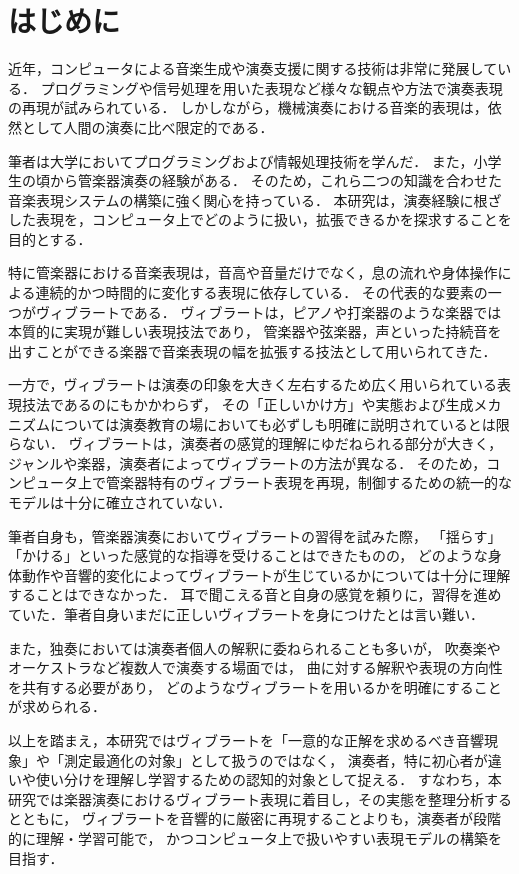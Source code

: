 \section{はじめに}

近年，コンピュータによる音楽生成や演奏支援に関する技術は非常に発展している．
プログラミングや信号処理を用いた表現など様々な観点や方法で演奏表現の再現が試みられている．
しかしながら，機械演奏における音楽的表現は，依然として人間の演奏に比べ限定的である．

筆者は大学においてプログラミングおよび情報処理技術を学んだ．
また，小学生の頃から管楽器演奏の経験がある．
そのため，これら二つの知識を合わせた音楽表現システムの構築に強く関心を持っている．
本研究は，演奏経験に根ざした表現を，コンピュータ上でどのように扱い，拡張できるかを探求することを目的とする．

特に管楽器における音楽表現は，音高や音量だけでなく，息の流れや身体操作による連続的かつ時間的に変化する表現に依存している．
その代表的な要素の一つがヴィブラートである．
ヴィブラートは，ピアノや打楽器のような楽器では本質的に実現が難しい表現技法であり，
管楽器や弦楽器，声といった持続音を出すことができる楽器で音楽表現の幅を拡張する技法として用いられてきた．

一方で，ヴィブラートは演奏の印象を大きく左右するため広く用いられている表現技法であるのにもかかわらず，
その「正しいかけ方」や実態および生成メカニズムについては演奏教育の場においても必ずしも明確に説明されているとは限らない．
ヴィブラートは，演奏者の感覚的理解にゆだねられる部分が大きく，ジャンルや楽器，演奏者によってヴィブラートの方法が異なる．
そのため，コンピュータ上で管楽器特有のヴィブラート表現を再現，制御するための統一的なモデルは十分に確立されていない．

筆者自身も，管楽器演奏においてヴィブラートの習得を試みた際，
「揺らす」「かける」といった感覚的な指導を受けることはできたものの，
どのような身体動作や音響的変化によってヴィブラートが生じているかについては十分に理解することはできなかった．
耳で聞こえる音と自身の感覚を頼りに，習得を進めていた．筆者自身いまだに正しいヴィブラートを身につけたとは言い難い．

また，独奏においては演奏者個人の解釈に委ねられることも多いが，
吹奏楽やオーケストラなど複数人で演奏する場面では，
曲に対する解釈や表現の方向性を共有する必要があり，
どのようなヴィブラートを用いるかを明確にすることが求められる．

以上を踏まえ，本研究ではヴィブラートを「一意的な正解を求めるべき音響現象」や「測定最適化の対象」として扱うのではなく，
演奏者，特に初心者が違いや使い分けを理解し学習するための認知的対象として捉える．
すなわち，本研究では楽器演奏におけるヴィブラート表現に着目し，その実態を整理分析するとともに，
ヴィブラートを音響的に厳密に再現することよりも，演奏者が段階的に理解・学習可能で，
かつコンピュータ上で扱いやすい表現モデルの構築を目指す．

